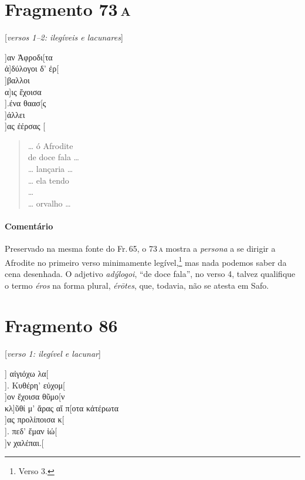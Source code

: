 \pagebreak

\section{Fragmento 73\,\textsc{a}} 

\begin{gkverse}
\textnormal{[\textit{versos 1--2: ilegíveis e lacunares}]}

]αν Ἀφροδι[τα\\
          ἀ]δύλογοι δ’ ἐρ[\\
        ]βαλλοι\\
      α]ις ἔχοισα\\
     ].ένα θαασ[ς\\
     ]άλλει\\
     ]ας ἐέρσας [

\end{gkverse}

\begin{verse}
\ldots{} ó Afrodite\\
de doce fala \ldots{}\\
\ldots{} lançaria \ldots{}\\
\ldots{} ela tendo\\
\ldots{}\\
\ldots{} orvalho \ldots{}\\
\end{verse}

\medskip

{\paragraph{Comentário} Preservado na mesma fonte do Fr.\,65, o 73\,\textsc{a} mostra a \textit{persona} a se dirigir a Afrodite no primeiro verso minimamente legível,\footnote{Verso 3.} mas nada podemos saber da cena desenhada. O adjetivo \textit{adýlogoi}, ``de doce fala'', no verso 4, talvez qualifique o termo \textit{éros} na forma plural, \textit{érōtes}, que, todavia, não se atesta em Safo.}

\pagebreak

\section{Fragmento 86}

\begin{gkverse}
\textnormal{[\textit{verso 1: ilegível e lacunar}]}

] αἰγιόχω λα[\\
]. Κυθέρη’ εὐχομ[\\
  ]ον ἔχοισα θῦμο[ν\\
κλ]ῦθί μ’ ἄρας αἴ π[οτα κἀτέρωτα\\
    ]ας προλίποισα κ[\\
    ]. πεδ’ ἔμαν ἰώ[\\
        ]ν χαλέπαι.[

\end{gkverse}

